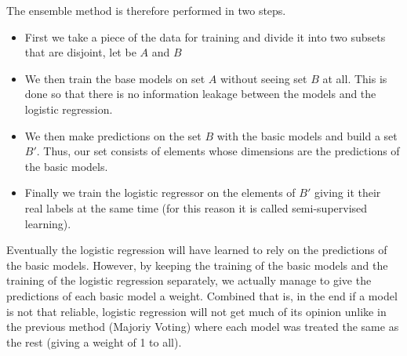 \documentclass[a4paper,12pt]{report}
\theoremstyle{definitionNODot}
\begin{document}
	The ensemble method is therefore performed in two steps.
	\begin{itemize}
		\item First we take a piece of the data for training and divide it into two subsets that are disjoint, let be $A$ and $B$
		\item We then train the base models on set $A$ without seeing set $B$ at all. This is done so that there is no information leakage between the models and the logistic regression.
		\item We then make predictions on the set $B$ with the basic models and build a set $B'$. Thus, our set consists of elements whose dimensions are the predictions of the basic models.
		\item Finally we train the logistic regressor on the elements of $B'$ giving it their real labels at the same time (for this reason it is called semi-supervised learning).
	\end{itemize}
	Eventually the logistic regression will have learned to rely on the predictions of the basic models. However, by keeping the training of the basic models and the training of the logistic regression separately, we actually manage to give the predictions of each basic model a weight. Combined that is, in the end if a model is not that reliable, logistic regression will not get much of its opinion unlike in the previous method (Majoriy Voting) where each model was treated the same as the rest (giving a weight of 1 to all).
	
\end{document}
